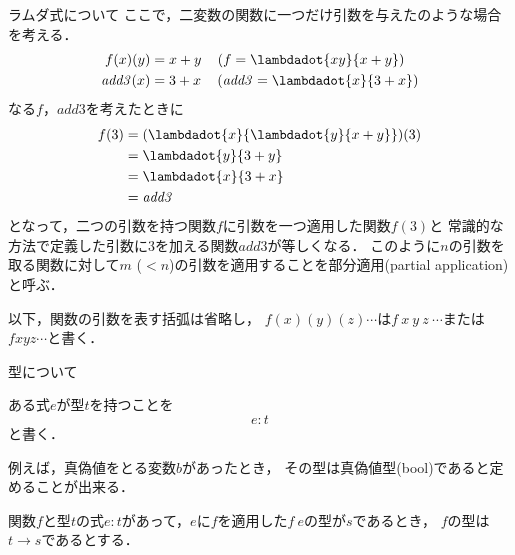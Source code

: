 \documentclass[a4paper,titlepage,report]{jsbook}
\begin{document}
\begin{resbonsiblesection}{ラムダ式について}{\sakamoto}
ここで，二変数の関数に一つだけ引数を与えたのような場合を考える．
\begin{align}
f (x)(y) &= x + y \quad \left(f = \lambdadot{xy}{x + y}\right) \\
\mathit{add3}(x)   &= 3 + x \quad \left(\mathit{add3} = \lambdadot{x}{3 + x}\right) 
\end{align}
なる$f$，$\mathit{add3}$を考えたときに
\begin{align}
\begin{aligned}
f(3)            &= (\lambdadot{x}{\lambdadot{y}{x+y}})(3) \\
                &= \lambdadot{y}{3 + y} \\
                &= \lambdadot{x}{3 + x} \\
                &= \mathit{add3}
\end{aligned}
\end{align}
となって，二つの引数を持つ関数$f$に引数を一つ適用した関数$f(3)$と
常識的な方法で定義した引数に3を加える関数$\mathit{add3}$が等しくなる．
このように$n$の引数を取る関数に対して$m$ ($<n$)の引数を適用することを部分適用(partial application)と呼ぶ．

以下，関数の引数を表す括弧は省略し，
$f(x)(y)(z)\cdots$は$f\ x\ y\ z\ \cdots$または$f x y z \cdots$と書く．
\end{resbonsiblesection}



\begin{resbonsiblesection}{型について}{\sakamoto}\label{sc:about-type}

ある式$e$が型$t$を持つことを
\begin{equation}
e: t
\end{equation}
と書く．

例えば，真偽値をとる変数$b$があったとき，
その型は真偽値型(\textsf{bool})であると定めることが出来る．

関数$f$と型$t$の式$e:t$があって，$e$に$f$を適用した$f\ e$の型が$s$であるとき，
$f$の型は$t\rightarrow s$であるとする．
\end{resbonsiblesection}
\end{document}
